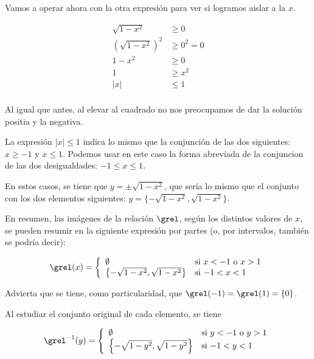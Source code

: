 \begin{example}
Vamos a operar ahora con la otra expresión para ver si logramos aislar a la
$x$.

\begin{align*}
  \sqrt{1 - x^2} &\geq 0 \\
  \left(\sqrt{1 - x^2}\right)^2 &\geq 0^2 = 0 \\
  1 - x^2 &\geq 0 \\
  1 &\geq x^2 \\
  |x| &\leq 1 \\
\end{align*}

\noindent Al igual que antes, al elevar al cuadrado no nos preocupamos de
dar la solución positia y la negativa.

La expresión $|x| \leq 1$ indica lo mismo que la conjunción de las dos
siguientes: $x \geq {-1}$ y $x \leq 1$. Podemos usar en este caso la forma
abreviada de la conjuncion de las dos desigualdades: ${-1} \leq x \leq 1$.

En estos casos, se tiene que $y = \pm\sqrt{1 - x^2}$, que sería lo mismo que
el conjunto con los dos elementos siguientes: $y = \{{-\sqrt{1 - x^2}},
\sqrt{1 - x^2}\}$.


En resumen, las imágenes de la relación $\grel$, según los distintos valores
de $x$, se pueden resumir en la siguiente expresión por partes (o, por
intervalos, también se podría decir):

$$
  \grel(x) =
  \left\{
  \begin{array}{ll}
    \emptyset
      & \text{si} \ x < {-1} \ \text{o} \ x > 1 \\
    \left\{{-\sqrt{1 - x^2}}, \sqrt{1 - x^2}\right\}
      & \text{si} \ {-1} < x < 1 \\
  \end{array}
  \right.
$$

\noindent Advierta que se tiene, como particularidad, que $\grel({-1}) =
\grel(1) = \{0\}$.

Al estudiar el conjunto original de cada elemento, se tiene

$$
  \grel^{-1}(y) =
  \left\{
  \begin{array}{ll}
    \emptyset
      & \text{si} \ y < {-1} \ \text{o} \ y > 1 \\
    \left\{{-\sqrt{1 - y^2}}, \sqrt{1 - y^2}\right\}
      & \text{si} \ {-1} < y < 1 \\
  \end{array}
  \right.
$$


\end{example}

